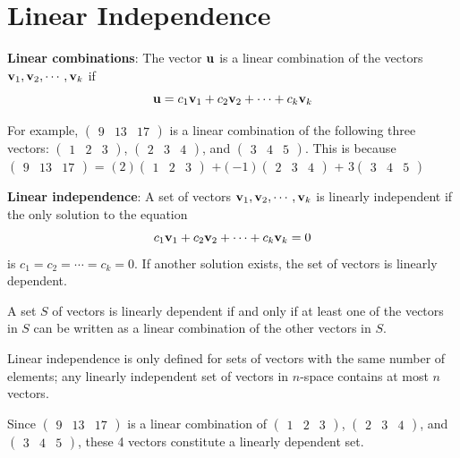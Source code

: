 \documentclass[]{book}
\theoremstyle{definition}
\theoremstyle{definition}
\theoremstyle{definition}
\theoremstyle{remark}
\begin{document}
\hypertarget{linearindependence}{%
\section{Linear Independence}\label{linearindependence}}

\textbf{Linear combinations}: The vector \({\bf u}\) is a linear combination of the vectors \({\bf v}_1, {\bf v}_2, \cdots , {\bf v}_k\) if
\[{\bf u} = c_1{\bf v}_1 + c_2{\bf v}_2 +  \cdots + c_k{\bf v}_k\]

For example, \(\begin{pmatrix}9 & 13 & 17 \end{pmatrix}\) is a linear combination of the following three vectors: \(\begin{pmatrix}1 & 2 & 3 \end{pmatrix}\), \(\begin{pmatrix} 2 & 3& 4\end{pmatrix}\), and \(\begin{pmatrix} 3 & 4 & 5 \end{pmatrix}\). This is because \(\begin{pmatrix}9 & 13 & 17 \end{pmatrix}\) = \((2)\begin{pmatrix}1 & 2 & 3 \end{pmatrix}\) \(+ (-1)\begin{pmatrix} 2 & 3& 4\end{pmatrix}\) + \(3\begin{pmatrix} 3 & 4 & 5 \end{pmatrix}\)

\textbf{Linear independence}: A set of vectors \({\bf v}_1, {\bf v}_2, \cdots , {\bf v}_k\) is linearly independent if the only solution to the equation
\[c_1{\bf v}_1 + c_2{\bf v}_2 +  \cdots + c_k{\bf v}_k = 0\]
is \(c_1 = c_2 = \cdots = c_k = 0\). If another solution exists, the set of vectors is linearly dependent.

A set \(S\) of vectors is linearly dependent if and only if at least one of the vectors in \(S\) can be written as a linear combination of the other vectors in \(S\).

Linear independence is only defined for sets of vectors with the same number of elements; any linearly independent set of vectors in \(n\)-space contains at most \(n\) vectors.

Since \(\begin{pmatrix}9 & 13 & 17 \end{pmatrix}\) is a linear combination of \(\begin{pmatrix}1 & 2 & 3 \end{pmatrix}\), \(\begin{pmatrix} 2 & 3& 4\end{pmatrix}\), and \(\begin{pmatrix} 3 & 4 & 5 \end{pmatrix}\), these 4 vectors constitute a linearly dependent set.
\end{document}
